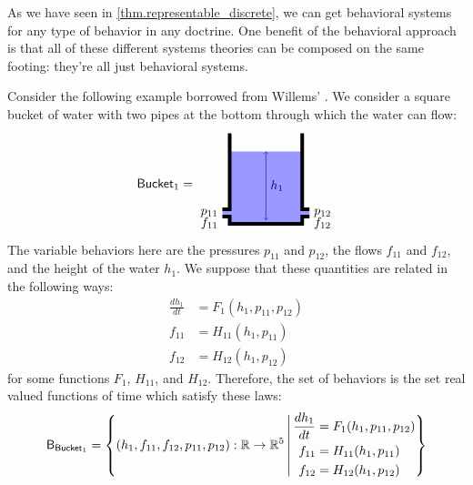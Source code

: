 \documentclass[DynamicalBook]{subfiles}
\begin{document}
As we have seen in
\cref{thm.representable_discrete}, we can get behavioral systems for any type of
behavior in any doctrine. One benefit of the behavioral approach is that all of
these different systems theories can be composed on the same footing: they're all just
behavioral systems.

Consider the following example borrowed from Willems'
\cite{Willems:2007a}. We consider a square bucket of water with
two pipes at the bottom through which the water can flow:
\[
  \Sys{Bucket}_1 =
  \begin{tikzpicture}[baseline=(center)]
    \fill[blue!40!white] (0, 0) rectangle (2,2);
    \fill[blue!40!white] (-.2, .2) rectangle (0.01,.4);
    \fill[blue!40!white] (2.2, .2) rectangle (1.99,.4);
    \draw[line width = .1cm] (0, 2.5) -- (0,.4) -- (-.2,.4);
    \draw[line width = .1cm] (-.2, .2) -- (0,.2) -- (0,0)
      -- (2,0) -- (2, .2) -- (2.2, .2);
    \draw[line width = .1cm] (2.2, .4) -- (2, .4) -- (2, 2.5);

    \draw[<->, blue!50!black] (1,.1cm) -- node[right] {$h_1$} (1, 2);
    \node[left] at (-.2, .3) {$p_{11}$};
    \node[below left] at (-.2, .3) {$f_{11}$};
    \node[right] at (2.2, .3) {$p_{12}$};
    \node[below right] at (2.2, .3) {$f_{12}$};

    \node (center) at (1, 1) {};
  \end{tikzpicture}
\]
The variable behaviors here are the pressures $p_{11}$ and $p_{12}$, the flows
$f_{11}$ and $f_{12}$, and the height of the water $h_1$. We suppose that these
quantities are related in the following ways:
\begin{align*}
  \frac{dh_1}{dt} &= F_1(h_1, p_{11}, p_{12}) \\
  f_{11} &= H_{11}(h_1, p_{11})\\
  f_{12} &= H_{12}(h_1, p_{12})
\end{align*}
for some functions $F_{1}$, $H_{11}$, and $H_{12}$. Therefore, the set of
behaviors is the set real valued functions of time which satisfy these laws:
\begin{equation}\label{eqn:bucket1.def}
\mathsf{B}_{\mathsf{Bucket}_1} = \left\{ (h_1, f_{11}, f_{12}, p_{11}, p_{12}) : \mathbb{R}
  \to \mathbb{R}^5\, \middle|\,
\begin{aligned}
  \frac{dh_1}{dt} &= F_1(h_1, p_{11}, p_{12}) \\
  f_{11} &= H_{11}(h_1, p_{11})\\
  f_{12} &= H_{12}(h_1, p_{12})
\end{aligned}
\right\}
\end{equation}
\end{document}
